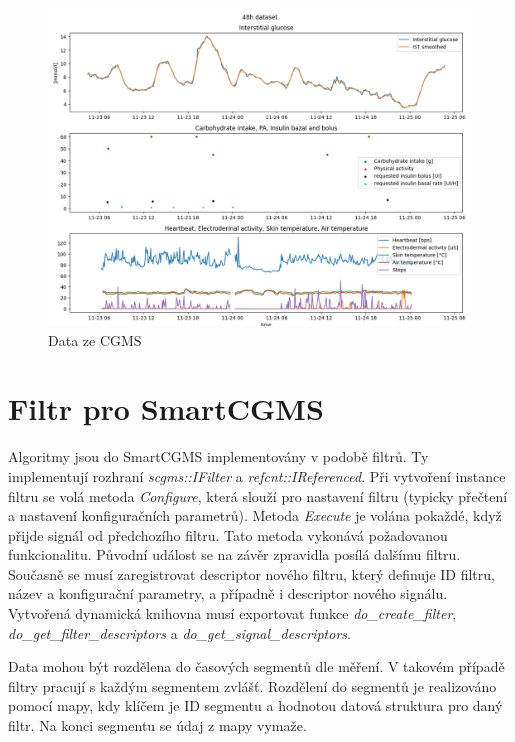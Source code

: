 \begin{figure}[H]
\caption{Data ze CGMS}
\label{fig:48h_dataset}
\centering
\includegraphics[width=1\textwidth]{img/cho/48h_dataset.png}
\end{figure}


\section{Filtr pro SmartCGMS}

Algoritmy jsou do SmartCGMS implementovány v podobě filtrů. Ty implementují rozhraní \textit{scgms::IFilter} a \textit{refcnt::IReferenced}. Při vytvoření instance filtru se volá metoda \textit{Configure}, která slouží pro nastavení filtru (typicky přečtení a nastavení konfiguračních parametrů). Metoda \textit{Execute} je volána pokaždé, když přijde signál od předchozího filtru. Tato metoda vykonává požadovanou funkcionalitu. Původní událost se na závěr zpravidla posílá dalšímu filtru. Současně se musí zaregistrovat descriptor nového filtru, který definuje ID filtru, název a konfigurační parametry, a případně i descriptor nového signálu. Vytvořená dynamická knihovna musí exportovat funkce \textit{do\_create\_filter}, \textit{do\_get\_filter\_descriptors} a \textit{do\_get\_signal\_descriptors}.

Data mohou být rozdělena do časových segmentů dle měření. V takovém případě filtry pracují s každým segmentem zvlášť. Rozdělení do segmentů je realizováno pomocí mapy, kdy klíčem je ID segmentu a hodnotou datová struktura pro daný filtr. Na konci segmentu se údaj z mapy vymaže.

